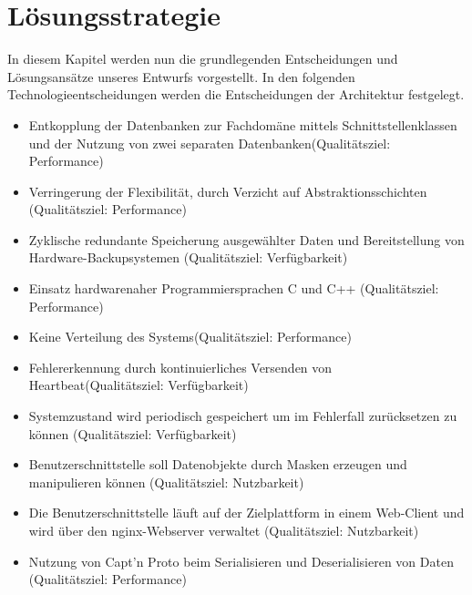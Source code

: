 \chapter{Lösungsstrategie}
\label{ch:Lösungsstrategie}
In diesem Kapitel werden nun die grundlegenden Entscheidungen und Lösungsansätze unseres Entwurfs vorgestellt. In den folgenden Technologieentscheidungen werden die Entscheidungen der Architektur festgelegt.  
\begin{itemize}
	\item Entkopplung der Datenbanken zur Fachdomäne mittels Schnittstellenklassen und der Nutzung von zwei separaten Datenbanken(Qualitätsziel: Performance)
	\item Verringerung der Flexibilität, durch Verzicht auf Abstraktionsschichten (Qualitätsziel: Performance)
	\item Zyklische redundante Speicherung ausgewählter Daten und Bereitstellung von Hardware-Backupsystemen (Qualitätsziel: Verfügbarkeit)
	\item Einsatz hardwarenaher Programmiersprachen C und C++ (Qualitätsziel: Performance)
	\item Keine Verteilung des Systems(Qualitätsziel: Performance)
	\item Fehlererkennung durch kontinuierliches Versenden von Heartbeat(Qualitätsziel: Verfügbarkeit)
	\item Systemzustand wird periodisch gespeichert um im Fehlerfall zurücksetzen zu können (Qualitätsziel: Verfügbarkeit) 
	\item Benutzerschnittstelle soll Datenobjekte durch Masken erzeugen und manipulieren können (Qualitätsziel: Nutzbarkeit) 
	\item Die Benutzerschnittstelle läuft auf der Zielplattform in einem Web-Client und wird über den nginx-Webserver verwaltet (Qualitätsziel: Nutzbarkeit)
	\item Nutzung von Capt'n Proto beim Serialisieren und Deserialisieren von Daten (Qualitätsziel: Performance)
\end{itemize}